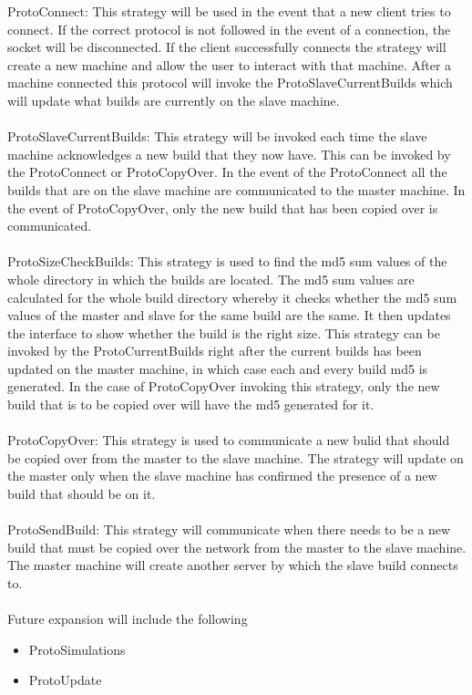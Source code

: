\documentclass[a4paper,12pt,final]{article}
\begin{document}
ProtoConnect: This strategy will be used in the event that a new client tries to connect. If 
the correct protocol is not followed in the event of a connection, the socket will be disconnected.
If the client successfully connects the strategy will create a new machine and allow the user to
interact with that machine. After a machine connected this protocol will invoke the ProtoSlaveCurrentBuilds
which will update what builds are currently on the slave machine.
\\
\textbf{\\}
ProtoSlaveCurrentBuilds: This strategy will be invoked each time the slave machine 
acknowledges a new build that they now have. This can be invoked by the ProtoConnect or
ProtoCopyOver. In the event of the ProtoConnect all the builds that are on the slave machine are
communicated to the master machine. In the event of ProtoCopyOver, only the new build that
has been copied over is communicated.
\\
\textbf{\\}
ProtoSizeCheckBuilds: This strategy is used to find the md5 sum values of the whole 
directory in which the builds are located. The md5 sum values are calculated for the whole
build directory whereby it checks whether the md5 sum values of the master and slave for the
same build are the same. It then updates the interface to show whether the build is the right size. 
This strategy can be invoked by the ProtoCurrentBuilds right after the current builds has been
updated on the master machine, in which case each and every build md5 is generated. In the case
of ProtoCopyOver invoking this strategy, only the new build that is to be copied over will have the md5
generated for it.
\\
\textbf{\\}
ProtoCopyOver: This strategy is used to communicate a new bulid that should be copied over
from the master to the slave machine. The strategy will update on the master only when the
slave machine has confirmed the presence of a new build that should be on it. 
\\
\textbf{\\}
ProtoSendBuild: This strategy will communicate when there needs to be a new build that
must be copied over the network from the master to the slave machine. The master machine will
create another server by which the slave build connects to.
\\
\textbf{\\}
Future expansion will include the following
\begin{itemize}
\item ProtoSimulations
\item ProtoUpdate
\end{itemize}
\end{document}
